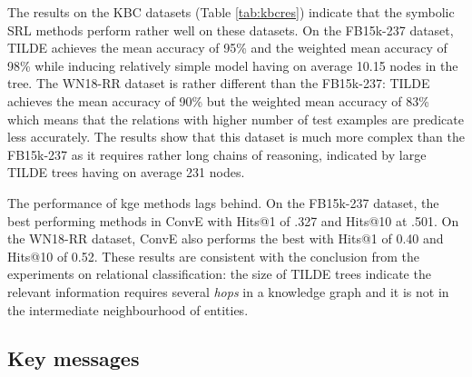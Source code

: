 The results on the KBC datasets (Table \ref{tab:kbcres}) indicate that the symbolic SRL methods perform rather well on these datasets.
On the FB15k-237 dataset, TILDE achieves the mean accuracy of 95\% and the weighted mean accuracy of 98\% while inducing relatively simple model having on average 10.15 nodes in the tree.
The WN18-RR dataset is rather different than the FB15k-237: TILDE achieves the mean accuracy of 90\% but the weighted mean accuracy of 83\% which means that the relations with higher number of test examples are predicate less accurately.
The results show that this dataset is much more complex than the FB15k-237 as it requires rather long chains of reasoning, indicated by large TILDE trees having on average 231 nodes.


The performance of \gls{kge} methods lags behind.
On the FB15k-237 dataset, the best performing methods in ConvE with Hits@1 of .327 and Hits@10 at .501.
On the WN18-RR dataset, ConvE also performs the best with Hits@1 of 0.40 and Hits@10 of 0.52.
These results are consistent with the conclusion from the experiments on relational classification: the size of TILDE trees indicate the relevant information requires several \textit{hops} in a knowledge graph and it is not in the intermediate neighbourhood of entities.





\subsection{Key messages}



